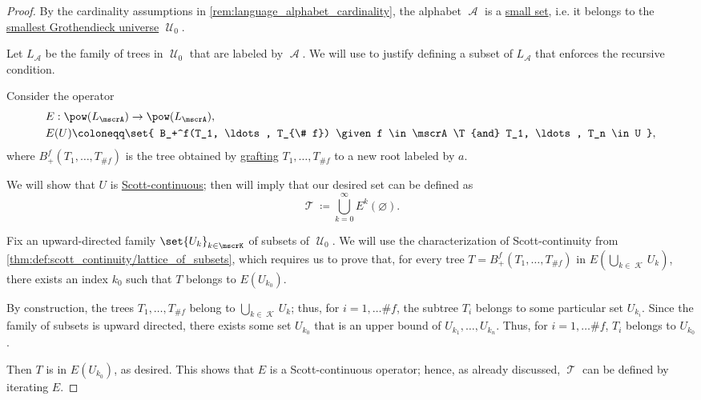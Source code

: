 \begin{proof}
  By the cardinality assumptions in \cref{rem:language_alphabet_cardinality}, the alphabet \( \mscrA \) is a \hyperref[def:small_set]{small set}, i.e. it belongs to the \hyperref[def:smallest_grothendieck_universe]{smallest Grothendieck universe} \( \mscrU_0 \).

  Let \( L_\mscrA \) be the family of trees in \( \mscrU_0 \) that are labeled by \( \mscrA \). We will use  to justify defining a subset of \( L_\mscrA \) that enforces the recursive condition.

  Consider the operator
  \begin{equation*}
    \begin{aligned}
      &E: \pow(L_\mscrA) \to \pow(L_\mscrA), \\
      &E(U) \coloneqq \set{ B_+^f(T_1, \ldots, T_{\# f}) \given f \in \mscrA \T{and} T_1, \ldots, T_n \in U },
    \end{aligned}
  \end{equation*}
  where \( B_+^f(T_1, \ldots, T_{\# f}) \) is the tree obtained by \hyperref[def:ordered_tree_grafting]{grafting} \( T_1, \ldots, T_{\# f} \) to a new root labeled by \( a \).

  We will show that \( U \) is \hyperref[def:scott_continuity]{Scott-continuous}; then  will imply that our desired set can be defined as
  \begin{equation*}
    \mscrT \coloneqq \bigcup_{k=0}^\infty E^k(\varnothing).
  \end{equation*}

  Fix an upward-directed family \( \set{ U_k }_{k \in \mscrK} \) of subsets of \( \mscrU_0 \). We will use the characterization of Scott-continuity from \cref{thm:def:scott_continuity/lattice_of_subsets}, which requires us to prove that, for every tree \( T = B_+^f(T_1, \ldots, T_{\# f}) \) in \( E(\bigcup_{k \in \mscrK} U_k) \), there exists an index \( k_0 \) such that \( T \) belongs to \( E(U_{k_0}) \).

  By construction, the trees \( T_1, \ldots, T_{\# f} \) belong to \( \bigcup_{k \in \mscrK} U_k \); thus, for \( i = 1, \ldots \# f \), the subtree \( T_i \) belongs to some particular set \( U_{k_i} \). Since the family of subsets is upward directed, there exists some set \( U_{k_0} \) that is an upper bound of \( U_{k_1}, \ldots, U_{k_n} \). Thus, for \( i = 1, \ldots \# f \), \( T_i \) belongs to \( U_{k_0} \).

  Then \( T \) is in \( E(U_{k_0}) \), as desired. This shows that \( E \) is a Scott-continuous operator; hence, as already discussed, \( \mscrT \) can be defined by iterating \( E \).
\end{proof}

